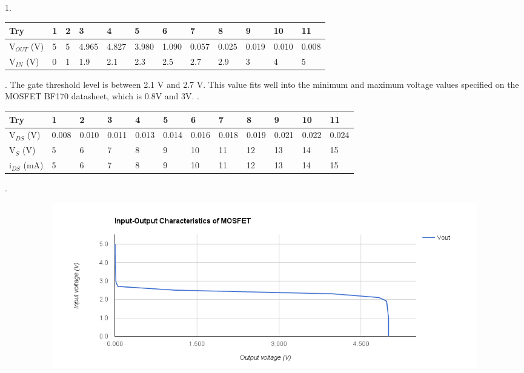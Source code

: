 {	\begin{solution}
		1. 		
		\begin{table}[h!]
			\begin{tabular}{| l | l | l | l | l | l | l | l | l | l | l | l |}
				\hline
				Try & 1 & 2 & 3 & 4 & 5 & 6 & 7 & 8 & 9 & 10 & 11 \\ \hline
				V$_{OUT}$ (V) & 5 & 5 & 4.965 & 4.827 & 3.980 & 1.090 & 0.057 & 0.025 & 0.019 & 0.010 & 0.008 \\ \hline
				V$_{IN}$ (V) & 0 & 1 & 1.9 & 2.1 & 2.3 & 2.5 & 2.7 & 2.9 & 3 & 4 & 5 \\ \hline
			\end{tabular}
		\end{table}
		.
		The gate threshold level is between 2.1 V and 2.7 V. This value fits well into the minimum and maximum voltage values specified on the MOSFET BF170 datasheet, which is 0.8V and 3V.
		.
		\begin{table}[h!]
			\begin{tabular}{| l | l | l | l | l | l | l | l | l | l | l | l |}
				\hline
				Try & 1 & 2 & 3 & 4 & 5 & 6 & 7 & 8 & 9 & 10 & 11 \\ \hline
				V$_{DS}$ (V) & 0.008 & 0.010 & 0.011 & 0.013 & 0.014 & 0.016 & 0.018 & 0.019 & 0.021 & 0.022 & 0.024 \\ \hline
				V$_{S}$ (V) & 5 & 6 & 7 & 8 & 9 & 10 & 11 & 12 & 13 & 14 & 15 \\ \hline
				i$_{DS}$ (mA) & 5 & 6 & 7 & 8 & 9 & 10 & 11 & 12 & 13 & 14 & 15 \\ \hline
			\end{tabular}
		\end{table}
		.
		\newline
		\begin{figure}[h!]
			\begin{subfigure}[H]{0.5\textwidth}
				\includegraphics[width=1\textwidth]{images/plot422.png}

\end{subfigure}
\end{figure}
\end{solution}}
